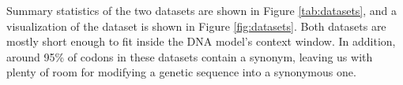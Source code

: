 \documentclass{article}
\begin{document}
Summary statistics of the two datasets are shown in Figure \ref{tab:datasets}, and a visualization of the dataset is shown in Figure \ref{fig:datasets}. Both datasets are mostly short enough to fit inside the DNA model's context window. In addition, around 95\% of codons in these datasets contain a synonym, leaving us with plenty of room for modifying a genetic sequence into a synonymous one.


\end{document}
